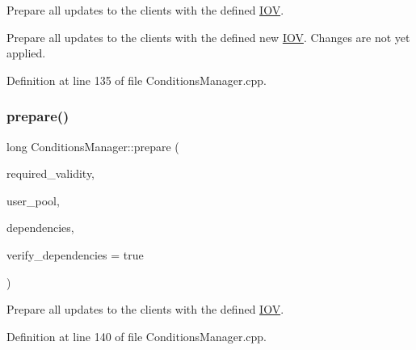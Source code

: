 Prepare all updates to the clients with the defined \hyperlink{class_d_d4hep_1_1_i_o_v}{I\+OV}. 

Prepare all updates to the clients with the defined new \hyperlink{class_d_d4hep_1_1_i_o_v}{I\+OV}. Changes are not yet applied. 

Definition at line 135 of file Conditions\+Manager.\+cpp.

\hypertarget{class_d_d4hep_1_1_conditions_1_1_conditions_manager_afb09828cf1420ca6a9abb815ccf7d06c}{}\label{class_d_d4hep_1_1_conditions_1_1_conditions_manager_afb09828cf1420ca6a9abb815ccf7d06c} 
\subsubsection{\texorpdfstring{prepare()}{prepare()}\hspace{0.1cm}{\footnotesize\ttfamily [4/4]}}
{\footnotesize\ttfamily long Conditions\+Manager\+::prepare (\begin{DoxyParamCaption}\item[{const \hyperlink{class_d_d4hep_1_1_i_o_v}{I\+OV} \&}]{required\+\_\+validity,  }\item[{\hyperlink{class_d_d4hep_1_1dd4hep__ptr}{dd4hep\+\_\+ptr}$<$ \hyperlink{class_d_d4hep_1_1_conditions_1_1_user_pool}{User\+Pool} $>$ \&}]{user\+\_\+pool,  }\item[{const \hyperlink{class_d_d4hep_1_1_conditions_1_1_conditions_manager_aab778cfbe096ae8ad20a0bdbb047ad32}{Dependencies} \&}]{dependencies,  }\item[{bool}]{verify\+\_\+dependencies = {\ttfamily true} }\end{DoxyParamCaption})}



Prepare all updates to the clients with the defined \hyperlink{class_d_d4hep_1_1_i_o_v}{I\+OV}. 



Definition at line 140 of file Conditions\+Manager.\+cpp.

\hypertarget{class_d_d4hep_1_1_conditions_1_1_conditions_manager_abc62c92ba92ab44843072adf85e1dde3}{}\label{class_d_d4hep_1_1_conditions_1_1_conditions_manager_abc62c92ba92ab44843072adf85e1dde3} 
